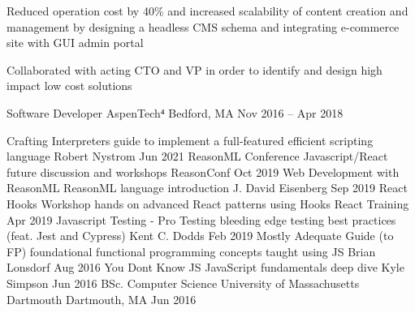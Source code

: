 \documentclass[]{awesome-cv}
\begin{document}
\begin{cventries}
{\begin{cvitems}
		\item {Reduced operation cost by 40\% and increased scalability of content creation and management by designing a headless CMS schema and integrating e-commerce site with GUI admin portal}
		\item {Collaborated with acting CTO and VP in order to identify and design high impact low cost solutions}
		\end{cvitems}}
	\cventry
	{Software Developer} 
	{AspenTech⁴}
	{Bedford, MA}
	{Nov 2016 – Apr 2018}
	{\begin{cvitems}
		\end{cvitems}}
	\vspace{-8mm}
\end{cventries}

\begin{cvhonors}
	\cvhonor
	{Crafting Interpreters}
	{guide to implement a full-featured efficient scripting language}
	{Robert Nystrom}
	{Jun 2021}
	\cvhonor
	{ReasonML Conference}
	{Javascript/React future discussion and workshops}
	{ReasonConf}
	{Oct 2019}
	\cvhonor
	{Web Development with ReasonML}
	{ReasonML language introduction}
	{J. David Eisenberg}
	{Sep 2019}
	\cvhonor
	{React Hooks Workshop}
	{hands on advanced React patterns using Hooks}
	{React Training}
	{Apr 2019}
	\cvhonor
	{Javascript Testing - Pro Testing}
	{bleeding edge testing best practices (feat. Jest and Cypress)}
	{Kent C. Dodds}
	{Feb 2019}
	\cvhonor
	{Mostly Adequate Guide (to FP)}
	{foundational functional programming concepts taught using JS}
	{Brian Lonsdorf}
	{Aug 2016}
	\cvhonor
	{You Don\textquotesingle{}t Know JS}
	{JavaScript fundamentals deep dive}
	{Kyle Simpson}
	{Jun 2016}
	\cvhonor
	{BSc. Computer Science}
	{University of Massachusetts Dartmouth}
	{Dartmouth, MA}
	{Jun 2016}
\end{cvhonors}
\end{document}
